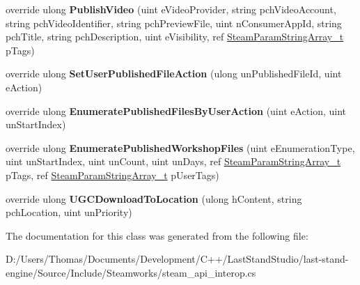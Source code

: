 \begin{DoxyCompactItemize}
\item 
\hypertarget{classValve_1_1Steamworks_1_1CSteamRemoteStorage_a35125702d7d8a7a05383bcf6f6e21e57}{}override ulong {\bfseries Publish\+Video} (uint e\+Video\+Provider, string pch\+Video\+Account, string pch\+Video\+Identifier, string pch\+Preview\+File, uint n\+Consumer\+App\+Id, string pch\+Title, string pch\+Description, uint e\+Visibility, ref \hyperlink{structValve_1_1Steamworks_1_1SteamParamStringArray__t}{Steam\+Param\+String\+Array\+\_\+t} p\+Tags)\label{classValve_1_1Steamworks_1_1CSteamRemoteStorage_a35125702d7d8a7a05383bcf6f6e21e57}

\item 
\hypertarget{classValve_1_1Steamworks_1_1CSteamRemoteStorage_a2c65f97ee94a1e5829c43ec04e3ce3dd}{}override ulong {\bfseries Set\+User\+Published\+File\+Action} (ulong un\+Published\+File\+Id, uint e\+Action)\label{classValve_1_1Steamworks_1_1CSteamRemoteStorage_a2c65f97ee94a1e5829c43ec04e3ce3dd}

\item 
\hypertarget{classValve_1_1Steamworks_1_1CSteamRemoteStorage_a9dad49fbac1fbd4524fdab557c0c3aa4}{}override ulong {\bfseries Enumerate\+Published\+Files\+By\+User\+Action} (uint e\+Action, uint un\+Start\+Index)\label{classValve_1_1Steamworks_1_1CSteamRemoteStorage_a9dad49fbac1fbd4524fdab557c0c3aa4}

\item 
\hypertarget{classValve_1_1Steamworks_1_1CSteamRemoteStorage_af638d95a2f6f26c653a17bbcdcd5b4ca}{}override ulong {\bfseries Enumerate\+Published\+Workshop\+Files} (uint e\+Enumeration\+Type, uint un\+Start\+Index, uint un\+Count, uint un\+Days, ref \hyperlink{structValve_1_1Steamworks_1_1SteamParamStringArray__t}{Steam\+Param\+String\+Array\+\_\+t} p\+Tags, ref \hyperlink{structValve_1_1Steamworks_1_1SteamParamStringArray__t}{Steam\+Param\+String\+Array\+\_\+t} p\+User\+Tags)\label{classValve_1_1Steamworks_1_1CSteamRemoteStorage_af638d95a2f6f26c653a17bbcdcd5b4ca}

\item 
\hypertarget{classValve_1_1Steamworks_1_1CSteamRemoteStorage_a635c169482588bed29828a5036ea8ccf}{}override ulong {\bfseries U\+G\+C\+Download\+To\+Location} (ulong h\+Content, string pch\+Location, uint un\+Priority)\label{classValve_1_1Steamworks_1_1CSteamRemoteStorage_a635c169482588bed29828a5036ea8ccf}

\end{DoxyCompactItemize}


The documentation for this class was generated from the following file\+:\begin{DoxyCompactItemize}
\item 
D\+:/\+Users/\+Thomas/\+Documents/\+Development/\+C++/\+Last\+Stand\+Studio/last-\/stand-\/engine/\+Source/\+Include/\+Steamworks/steam\+\_\+api\+\_\+interop.\+cs\end{DoxyCompactItemize}
